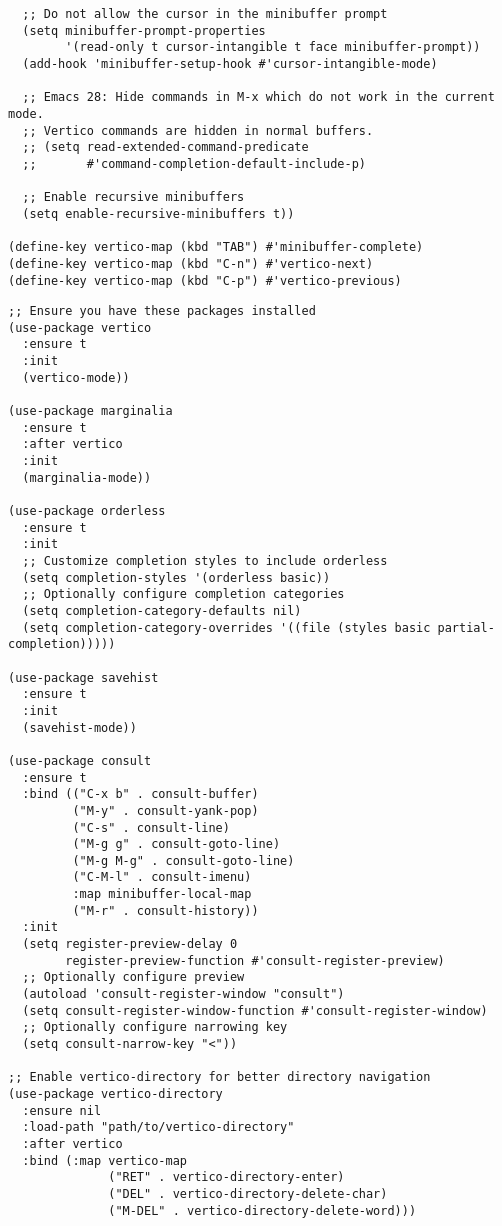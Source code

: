 \documentclass{article}
\begin{document}
\begin{itemize}
\begin{itemize}
\begin{verbatim}
  ;; Do not allow the cursor in the minibuffer prompt
  (setq minibuffer-prompt-properties
        '(read-only t cursor-intangible t face minibuffer-prompt))
  (add-hook 'minibuffer-setup-hook #'cursor-intangible-mode)

  ;; Emacs 28: Hide commands in M-x which do not work in the current mode.
  ;; Vertico commands are hidden in normal buffers.
  ;; (setq read-extended-command-predicate
  ;;       #'command-completion-default-include-p)

  ;; Enable recursive minibuffers
  (setq enable-recursive-minibuffers t))

(define-key vertico-map (kbd "TAB") #'minibuffer-complete)
(define-key vertico-map (kbd "C-n") #'vertico-next)
(define-key vertico-map (kbd "C-p") #'vertico-previous)

\end{verbatim}
\begin{verbatim}
;; Ensure you have these packages installed
(use-package vertico
  :ensure t
  :init
  (vertico-mode))

(use-package marginalia
  :ensure t
  :after vertico
  :init
  (marginalia-mode))

(use-package orderless
  :ensure t
  :init
  ;; Customize completion styles to include orderless
  (setq completion-styles '(orderless basic))
  ;; Optionally configure completion categories
  (setq completion-category-defaults nil)
  (setq completion-category-overrides '((file (styles basic partial-completion)))))

(use-package savehist
  :ensure t
  :init
  (savehist-mode))

(use-package consult
  :ensure t
  :bind (("C-x b" . consult-buffer)
         ("M-y" . consult-yank-pop)
         ("C-s" . consult-line)
         ("M-g g" . consult-goto-line)
         ("M-g M-g" . consult-goto-line)
         ("C-M-l" . consult-imenu)
         :map minibuffer-local-map
         ("M-r" . consult-history))
  :init
  (setq register-preview-delay 0
        register-preview-function #'consult-register-preview)
  ;; Optionally configure preview
  (autoload 'consult-register-window "consult")
  (setq consult-register-window-function #'consult-register-window)
  ;; Optionally configure narrowing key
  (setq consult-narrow-key "<"))

;; Enable vertico-directory for better directory navigation
(use-package vertico-directory
  :ensure nil
  :load-path "path/to/vertico-directory"
  :after vertico
  :bind (:map vertico-map
              ("RET" . vertico-directory-enter)
              ("DEL" . vertico-directory-delete-char)
              ("M-DEL" . vertico-directory-delete-word)))


\end{verbatim}
\end{itemize}
\end{itemize}
\end{document}
